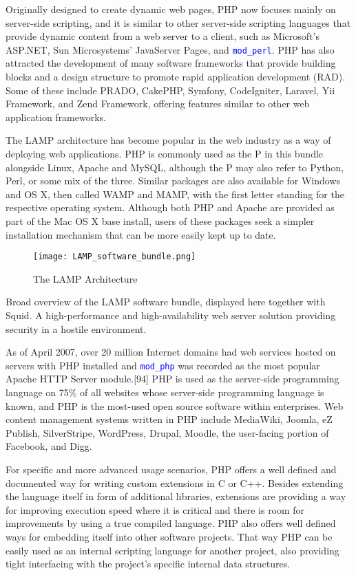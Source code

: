 Originally designed to create dynamic web pages, PHP now focuses mainly on server-side scripting, and it is similar to other server-side scripting languages that provide dynamic content from a web server to a client, such as Microsoft's ASP.NET, Sun Microsystems' JavaServer Pages, and \textcolor{Blue}{\texttt{mod\_perl}}. PHP has also attracted the development of many software frameworks that provide building blocks and a design structure to promote rapid application development (RAD). Some of these include PRADO, CakePHP, Symfony, CodeIgniter, Laravel, Yii Framework, and Zend Framework, offering features similar to other web application frameworks.

The LAMP architecture has become popular in the web industry as a way of deploying web applications. PHP is commonly used as the P in this bundle alongside Linux, Apache and MySQL, although the P may also refer to Python, Perl, or some mix of the three. Similar packages are also available for Windows and OS X, then called WAMP and MAMP, with the first letter standing for the respective operating system. Although both PHP and Apache are provided as part of the Mac OS X base install, users of these packages seek a simpler installation mechanism that can be more easily kept up to date.

\begin{figure}[!h]
\centering
\texttt{[image: LAMP\_software\_bundle.png]}
\caption{The LAMP Architecture}
\label{LAMP_software_bundle}
\end{figure}

Broad overview of the LAMP software bundle, displayed here together with Squid. A high-performance and high-availability web server solution providing security in a hostile environment.

As of April 2007, over 20 million Internet domains had web services hosted on servers with PHP installed and \textcolor{Blue}{\texttt{mod\_php}} was recorded as the most popular Apache HTTP Server module.[94] PHP is used as the server-side programming language on 75\% of all websites whose server-side programming language is known, and PHP is the most-used open source software within enterprises. Web content management systems written in PHP include MediaWiki, Joomla, eZ Publish, SilverStripe, WordPress, Drupal, Moodle, the user-facing portion of Facebook, and Digg.

For specific and more advanced usage scenarios, PHP offers a well defined and documented way for writing custom extensions in C or C++. Besides extending the language itself in form of additional libraries, extensions are providing a way for improving execution speed where it is critical and there is room for improvements by using a true compiled language. PHP also offers well defined ways for embedding itself into other software projects. That way PHP can be easily used as an internal scripting language for another project, also providing tight interfacing with the project's specific internal data structures.

